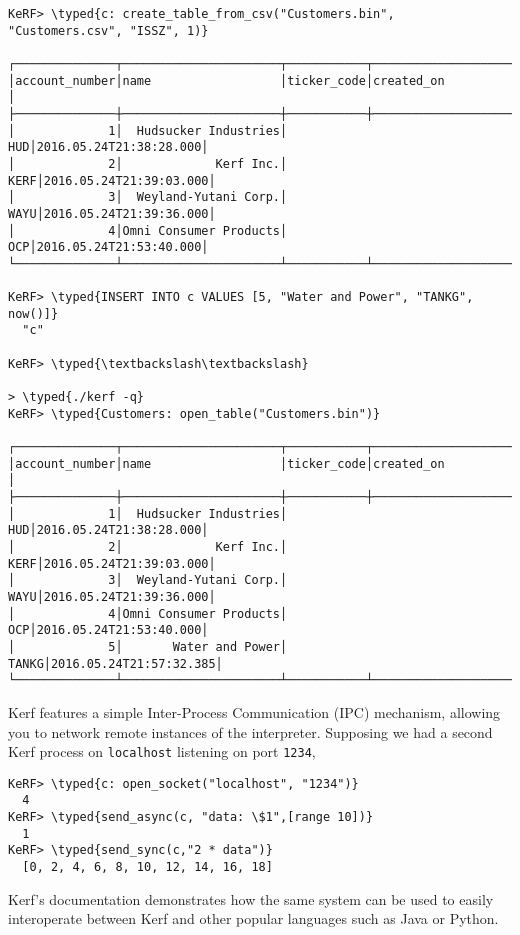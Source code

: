 \documentclass{article}
\newcommand{\typed}[1]{\textcolor{TealBlue}{#1}}
\begin{document}
\begin{Verbatim}
KeRF> \typed{c: create_table_from_csv("Customers.bin", "Customers.csv", "ISSZ", 1)}

┌──────────────┬──────────────────────┬───────────┬───────────────────────┐
│account_number│name                  │ticker_code│created_on             │
├──────────────┼──────────────────────┼───────────┼───────────────────────┤
│             1│  Hudsucker Industries│        HUD│2016.05.24T21:38:28.000│
│             2│             Kerf Inc.│       KERF│2016.05.24T21:39:03.000│
│             3│  Weyland-Yutani Corp.│       WAYU│2016.05.24T21:39:36.000│
│             4│Omni Consumer Products│        OCP│2016.05.24T21:53:40.000│
└──────────────┴──────────────────────┴───────────┴───────────────────────┘

KeRF> \typed{INSERT INTO c VALUES [5, "Water and Power", "TANKG", now()]}
  "c"

KeRF> \typed{\textbackslash\textbackslash}

> \typed{./kerf -q}
KeRF> \typed{Customers: open_table("Customers.bin")}

┌──────────────┬──────────────────────┬───────────┬───────────────────────┐
│account_number│name                  │ticker_code│created_on             │
├──────────────┼──────────────────────┼───────────┼───────────────────────┤
│             1│  Hudsucker Industries│        HUD│2016.05.24T21:38:28.000│
│             2│             Kerf Inc.│       KERF│2016.05.24T21:39:03.000│
│             3│  Weyland-Yutani Corp.│       WAYU│2016.05.24T21:39:36.000│
│             4│Omni Consumer Products│        OCP│2016.05.24T21:53:40.000│
│             5│       Water and Power│      TANKG│2016.05.24T21:57:32.385│
└──────────────┴──────────────────────┴───────────┴───────────────────────┘
\end{Verbatim}

Kerf features a simple Inter-Process Communication (IPC) mechanism, allowing you to network remote instances of the interpreter. Supposing we had a second Kerf process on \texttt{localhost} listening on port \texttt{1234},

\begin{Verbatim}
KeRF> \typed{c: open_socket("localhost", "1234")}
  4
KeRF> \typed{send_async(c, "data: \$1",[range 10])}
  1
KeRF> \typed{send_sync(c,"2 * data")}
  [0, 2, 4, 6, 8, 10, 12, 14, 16, 18]
\end{Verbatim}

Kerf's documentation demonstrates how the same system can be used to easily interoperate between Kerf and other popular languages such as Java or Python.
\end{document}
